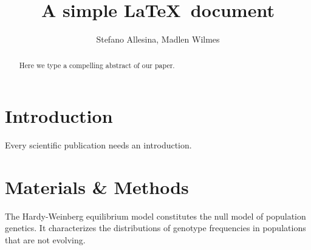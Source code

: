 \documentclass[12pt]{article}
\title{A simple \LaTeX\ document}
\author{Stefano Allesina, Madlen Wilmes}
\date{}
\begin{document}
\maketitle
\begin{abstract}
Here we type a compelling abstract of our paper.
\end{abstract}
\section{Introduction}
Every scientific publication needs an introduction.
\section{Materials \& Methods}
The Hardy-Weinberg equilibrium model constitutes the null model of population genetics. It characterizes the distributions of genotype  frequencies in populations that are not evolving.
\end{document}
